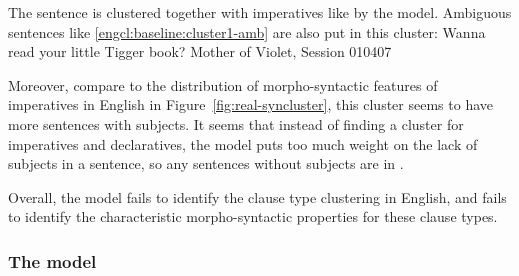 The sentence is clustered together with imperatives like  by the model. Ambiguous sentences like \ref{engcl:baseline:cluster1-amb} are also put in this cluster:
Wanna read your little Tigger book? \hfill Mother of Violet, Session 010407
\eex

Moreover, compare to the distribution of morpho-syntactic features of imperatives in English in Figure~\ref{fig:real-syncluster}, this cluster seems to have more sentences with subjects. It seems that instead of finding a cluster for imperatives and declaratives, the model puts too much weight on the lack of subjects in a sentence, so any sentences without subjects are in . 

Overall, the \dlearnerabbr{} model fails to identify the clause type clustering in English, and fails to identify the characteristic morpho-syntactic properties for these clause types. 


\subsubsection{The \plearnerabbr{} model}
\label{sec:engcl:model:results:p}

